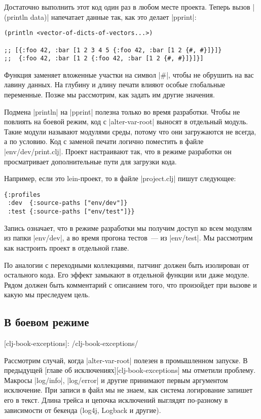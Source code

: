 Достаточно выполнить этот код один раз в любом месте проекта. Теперь вызов
\spverb|(println data)| напечатает данные так, как это делает \spverb|pprint|:

\begin{verbatim}
(println <vector-of-dicts-of-vectors...>)

;; [{:foo 42, :bar [1 2 3 4 5 {:foo 42, :bar [1 2 {#, #}]}]}
;;  {:foo 42, :bar [1 2 {:foo 42, :bar [1 2 {#, #}]}]}]
\end{verbatim}

Функция заменяет вложенные участки на символ \spverb|#|, чтобы не обрушить на вас лавину
данных. На глубину и длину печати влияют особые глобальные переменные. Позже мы
рассмотрим, как задать им другие значения.

Подмена \spverb|println| на \spverb|pprint| полезна только во время разработки. Чтобы не
повлиять на боевой режим, код с \spverb|alter-var-root| выносят в отдельный
модуль. Такие модули называют модулями среды, потому что они загружаются не
всегда, а по условию. Код с заменой печати логично поместить в файле
\spverb|env/dev/print.clj|. Проект настраивают так, что в режиме разработки он
просматривает дополнительные пути для загрузки кода.

Например, если это lein-проект, то в файле \spverb|project.clj| пишут следующее:

\begin{verbatim}
{:profiles
 :dev  {:source-paths ["env/dev"]}
 :test {:source-paths ["env/test"]}}
\end{verbatim}

Запись означает, что в режиме разработки мы получим доступ ко всем модулям из
папки \spverb|env/dev|, а во время прогона тестов~--- из \spverb|env/test|. Мы рассмотрим как
настроить проект в отдельной главе.

По аналогии с переходными коллекциями, патчинг должен быть изолирован от
остального кода. Его эффект замыкают в отдельной функции или даже модуле. Рядом
должен быть комментарий с описанием того, что произойдет при вызове и какую мы
преследуем цель.

\subsection{В боевом режиме}

[clj-book-exceptions]: /clj-book-exceptions/

Рассмотрим случай, когда \spverb|alter-var-root| полезен в промышленном запуске. В
предыдущей [главе об исключениях][clj-book-exceptions] мы отметили
проблему. Макросы \spverb|log/info|, \spverb|log/error| и другие принимают первым аргументом
исключение. При записи в файл мы не знаем, как система логирование запишет его в
текст. Длина трейса и цепочка исключений выглядят по-разному в зависимости от
бекенда (log4j, Logback и другие).

